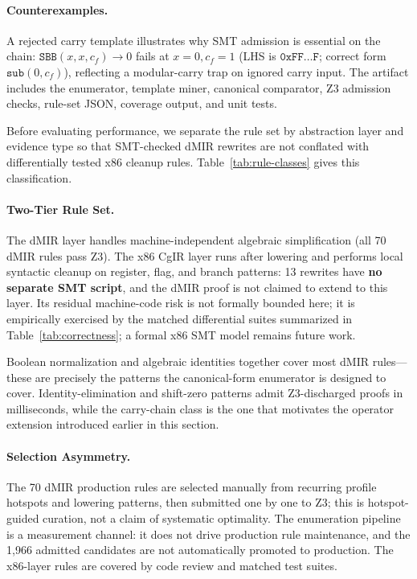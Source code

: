 \paragraph{Counterexamples.} A rejected carry template illustrates why
SMT admission is essential on the chain: $\texttt{SBB}(x, x, c_f) \to 0$
fails at $x{=}0, c_f{=}1$ (LHS is $\texttt{0xFF}\ldots\texttt{F}$;
correct form $\texttt{sub}(0, c_f)$), reflecting a modular-carry trap
on ignored carry input. The artifact includes the enumerator, template
miner, canonical comparator, Z3 admission checks, rule-set JSON,
coverage output, and unit tests.

Before evaluating performance, we separate the rule set by abstraction
layer and evidence type so that SMT-checked dMIR rewrites are not
conflated with differentially tested x86 cleanup rules.
Table~\ref{tab:rule-classes} gives this classification.



\paragraph{Two-Tier Rule Set.} The dMIR layer handles
machine-independent algebraic simplification (all 70 dMIR rules pass Z3).
The x86 CgIR layer runs after lowering and performs local syntactic cleanup
on register, flag, and branch patterns: 13 rewrites have
\textbf{no separate SMT script}, and the dMIR proof is not claimed to
extend to this layer. Its residual machine-code risk is not formally
bounded here; it is empirically exercised by the matched differential
suites summarized in Table~\ref{tab:correctness}; a formal x86 SMT model
remains future work.

Boolean normalization and algebraic identities together cover most dMIR
rules---these are precisely the patterns the canonical-form enumerator
is designed to cover. Identity-elimination
and shift-zero patterns admit Z3-discharged proofs in milliseconds,
while the carry-chain class is the one that motivates the operator
extension introduced earlier in this section.

\paragraph{Selection Asymmetry.} The 70 dMIR production rules are
selected manually from recurring profile hotspots and lowering
patterns, then submitted one by one to Z3; this is hotspot-guided
curation, not a claim of systematic optimality. The enumeration pipeline
is a measurement channel: it does not drive production rule maintenance,
and the 1{,}966 admitted candidates are not automatically promoted to
production. The x86-layer rules are covered by code review and matched
test suites.
